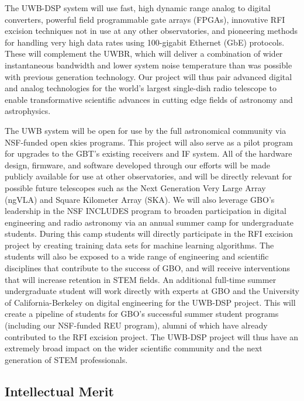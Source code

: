 \documentclass[10pt]{myNSF}
\begin{document}
The UWB-DSP system will use fast, high dynamic range analog to
digital converters, powerful field programmable gate arrays
(FPGAs), innovative RFI excision techniques not in use at any
other observatories, and pioneering methods for handling very high
data rates using 100-gigabit Ethernet (GbE) protocols.  These will
complement the UWBR, which will deliver a combination of wider
instantaneous bandwidth and lower system noise temperature than was
possible with previous generation technology.  Our project will thus
pair advanced digital and analog technologies for the world's largest
single-dish radio telescope to enable transformative scientific
advances in cutting edge fields of astronomy and astrophysics.

The UWB system will be open for use by the full astronomical community
via NSF-funded open skies programs.  This project will also serve as a
pilot program for upgrades to the GBT's existing receivers and IF
system.  All of the hardware design, firmware, and software developed
through our efforts will be made publicly available for use at other
observatories, and will be directly relevant for possible future
telescopes such as the Next Generation Very Large Array (ngVLA) and
Square Kilometer Array (SKA).  We will also leverage GBO's leadership
in the NSF INCLUDES program to broaden participation in digital
engineering and radio astronomy via an annual summer camp for
undergraduate students.  During this camp students will directly
participate in the RFI excision project by creating training data sets
for machine learning algorithms.  The students will also be exposed to
a wide range of engineering and scientific disciplines that contribute
to the success of GBO, and will receive interventions that will
increase retention in STEM fields.  An additional full-time summer
undergraduate student will work directly with experts at GBO and the
University of California-Berkeley on digital engineering for the
UWB-DSP project.  This will create a pipeline of students for GBO's
successful summer student programs (including our NSF-funded REU
program), alumni of which have already contributed to the RFI excision
project.  The UWB-DSP project will thus have an extremely broad impact
on the wider scientific community and the next generation of STEM
professionals.

\subsection{Intellectual Merit}
\label{sec:IM}
\end{document}
